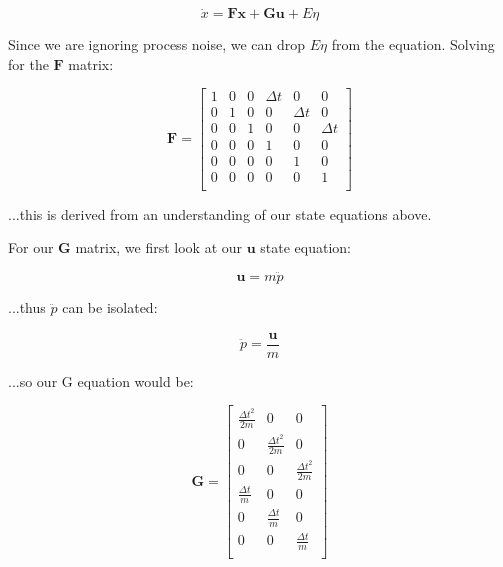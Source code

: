 \documentclass{article}
\begin{document}
\begin{equation}
    \textbf{$\dot{x}$} = \textbf{F} \textbf{x} + \textbf{G} \textbf{u} + E \eta
\end{equation}


Since we are ignoring process noise, we can drop $E \eta$ from the equation. Solving for the $\textbf{F}$ matrix:

\begin{equation}
    \textbf{F} = \begin{bmatrix}
        1 & 0 & 0 & \Delta t & 0        & 0        \\
        0 & 1 & 0 & 0        & \Delta t & 0        \\
        0 & 0 & 1 & 0        & 0        & \Delta t \\
        0 & 0 & 0 & 1        & 0        & 0        \\
        0 & 0 & 0 & 0        & 1        & 0        \\
        0 & 0 & 0 & 0        & 0        & 1        \\
    \end{bmatrix}
\end{equation}

...this is derived from an understanding of our state equations above.

For our \textbf{G} matrix, we first look at our $\textbf{u}$ state equation:

\begin{equation}
    \textbf{u} = m \textbf{$\ddot{p}$}
\end{equation}

...thus $\textbf{$\ddot{p}$}$ can be isolated:

\begin{equation}
    \textbf{$\ddot{p}$} = \frac{\textbf{u}}{m}
\end{equation}

...so our G equation would be:

\begin{equation}
    \textbf{G} = \begin{bmatrix}
        \frac{\Delta t^2}{2m} & 0                     & 0                     \\
        0                     & \frac{\Delta t^2}{2m} & 0                     \\
        0                     & 0                     & \frac{\Delta t^2}{2m} \\
        \frac{\Delta t}{m}    & 0                     & 0                     \\
        0                     & \frac{\Delta t}{m}    & 0                     \\
        0                     & 0                     & \frac{\Delta t}{m}    \\
    \end{bmatrix}
\end{equation}
\end{document}
